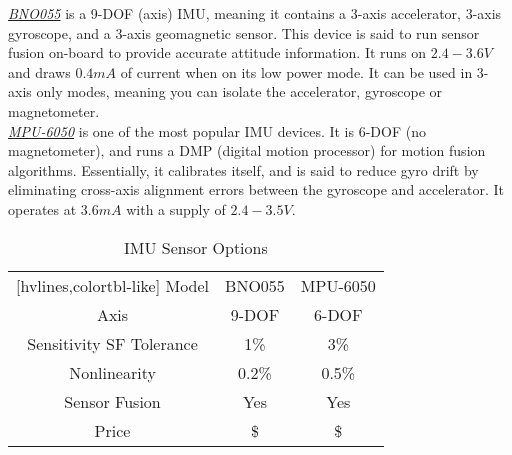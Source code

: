 \noindent \underline{\textit{BNO055}} is a 9-DOF (axis) IMU, meaning it contains a 3-axis accelerator, 3-axis gyroscope, and a 3-axis geomagnetic sensor. This device is said to run sensor fusion on-board to provide accurate attitude information. It runs on $2.4-3.6V$ and draws $0.4mA$ of current when on its low power mode. It can be used in 3-axis only modes, meaning you can isolate the accelerator, gyroscope or magnetometer.\\

\noindent \underline{\textit{MPU-6050}} is one of the most popular IMU devices. It is 6-DOF (no magnetometer), and runs a DMP (digital motion processor) for motion fusion algorithms. Essentially, it calibrates itself, and is said to reduce gyro drift by eliminating cross-axis alignment errors between the gyroscope and accelerator. It operates at $3.6mA$ with a supply of $2.4-3.5V$.\\

\begin{table}[H]
	\centering
	\setlength{\tabcolsep}{5pt} %
	\renewcommand{\arraystretch}{1.5} %
	\begin{NiceTabular}{ccc}[hvlines,colortbl-like]
		\CodeBefore
		\Body
		Model         & BNO055 & MPU-6050 \\
		Axis          & 9-DOF   & 6-DOF    \\
		Sensitivity SF Tolerance & 1\% & 3\%  \\
		Nonlinearity  & 0.2\%   & 0.5\%    \\
		Sensor Fusion & Yes     & Yes      \\
		Price         & \$      & \$       \\
	\end{NiceTabular}
	\caption{\label{fig:compareIMU}IMU Sensor Options}
\end{table}

